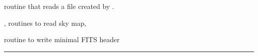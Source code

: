 \begin{related}
  \begin{sulist}{} %
  \item[\htmlref{input\_tod*}{sub:input_tod}] routine that reads a file created by \thedocid. 
  \item[\htmlref{input\_map}{sub:input_map},
  \htmlref{read\_bintab}{sub:read_bintab}] routines to read \healpix sky map,
  \item[\htmlref{write\_minimal\_header}{sub:write_minimal_header}] routine to write minimal FITS header
  \end{sulist}
\end{related}

\rule{\hsize}{2mm}

\newpage
